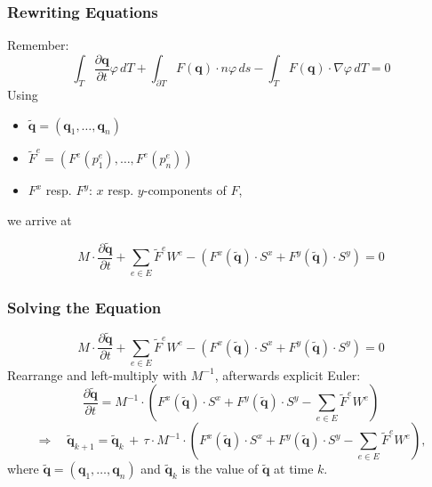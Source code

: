 \documentclass{beamer}
\newcommand{\pd}[2]{\dfrac{\partial #1}{\partial #2}}
\renewcommand{\phi}{\varphi}
\begin{document}
\begin{frame}
  \frametitle{Rewriting Equations}
  Remember:
  \begin{equation*}
    \int_T \pd {\mathbf{q}}{t} \phi \, dT +
    \int_{\partial T} F\left(\mathbf{q}\right) \cdot n \phi \, ds -
    \int_T F(\mathbf{q}) \cdot \nabla \phi \, dT = 0
  \end{equation*}
  Using
  \begin{itemize}
  \item $\tilde{\mathbf{q}} = (\mathbf{q}_1,\dots,\mathbf{q}_n)$
  \item $\tilde{F}^e=(F^e(p_1^e),\dots,F^e(p_n^e))$
  \item $F^x$ resp. $F^y$: $x$ resp. $y$-components of $F$,
  \end{itemize}
  we arrive at
  
  \begin{equation*}
    M \cdot \pd{\tilde{\mathbf{q}}}{t} +
    \sum_{e \in E} \tilde{F}^e W^e -
    \left(F^x(\tilde{\mathbf{q}}) \cdot S^x +
      F^y(\tilde{\mathbf{q}}) \cdot S^y\right) = 0
  \end{equation*}
\end{frame}

\begin{frame}
  \frametitle{Solving the Equation}
  \begin{equation*}
    M \cdot \pd{\tilde{\mathbf{q}}}{t} +
    \sum_{e \in E} \tilde{F}^e W^e -
    \left(F^x(\tilde{\mathbf{q}}) \cdot S^x +
      F^y(\tilde{\mathbf{q}}) \cdot S^y\right) = 0
  \end{equation*}
  Rearrange and left-multiply with $M^{-1}$, afterwards explicit Euler:
  \begin{equation*}
    \pd{\tilde{\mathbf{q}}}{t} =
    M^{-1} \cdot \left(
      F^x(\tilde{\mathbf{q}}) \cdot S^x +
      F^y(\tilde{\mathbf{q}}) \cdot S^y -
      \sum_{e \in E} \tilde{F}^e W^e\right
    )
  \end{equation*}
  \begin{equation*}
    \Rightarrow \quad
    \tilde{\mathbf{q}}_{k+1} =
    \tilde{\mathbf{q}}_{k} \,+ \,
    \tau \cdot M^{-1} \cdot \left(
      F^x(\tilde{\mathbf{q}}) \cdot S^x +
      F^y(\tilde{\mathbf{q}}) \cdot S^y -
      \sum_{e \in E} \tilde{F}^e W^e\right
    ),
  \end{equation*}
  where $\tilde{\mathbf{q}} = (\mathbf{q}_1,\dots,\mathbf{q}_n)$ and $\tilde{\mathbf{q}}_k$ is the value of $\tilde{\mathbf{q}}$ at time $k$.
\end{frame}
\end{document}
